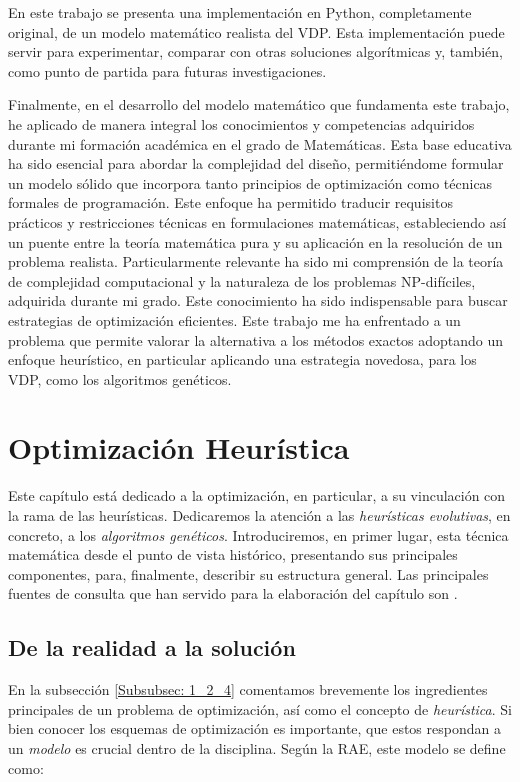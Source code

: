 \documentclass[12pt,a4paper]{book}
\begin{document}
En este trabajo se presenta una implementación en Python, completamente original, de un modelo matemático realista del VDP. Esta implementación puede servir para experimentar, comparar con otras soluciones algorítmicas y, también, como punto de partida para futuras investigaciones. 

Finalmente, en el desarrollo del modelo matemático que fundamenta este trabajo, he aplicado de manera integral los conocimientos y competencias adquiridos durante mi formación académica en el grado de Matemáticas. Esta base educativa ha sido esencial para abordar la complejidad del diseño, permitiéndome formular un modelo sólido que incorpora tanto principios de optimización como técnicas formales de programación.  Este enfoque ha permitido traducir requisitos prácticos y restricciones técnicas en formulaciones matemáticas, estableciendo así un puente entre la teoría matemática pura y su aplicación en la resolución de un problema realista. Particularmente relevante ha sido mi comprensión de la teoría de complejidad computacional y la naturaleza de los problemas NP-difíciles, adquirida durante mi grado. Este conocimiento ha sido indispensable para buscar estrategias de optimización eficientes. Este trabajo me ha enfrentado a un problema que permite valorar la alternativa a los métodos exactos adoptando un enfoque heurístico, en particular aplicando una estrategia novedosa, para los VDP, como los algoritmos genéticos. 

\chapter{Optimización Heurística} \label{Capitulo_2}
Este capítulo está dedicado a la optimización, en particular, a su vinculación con la rama de las heurísticas. Dedicaremos la atención a las \textsl{heurísticas evolutivas}, en concreto, a los \textsl{algoritmos genéticos}. Introduciremos, en primer lugar, esta técnica matemática desde el punto de vista histórico, presentando sus principales componentes, para, finalmente, describir su estructura general. Las principales fuentes de consulta que han servido para la elaboración del capítulo son \cite{cuevas_matlab_2021, e_besada_optimizacion_nodate, hooker_testing_1995, gparedes_hernandez_fundamentos_2021, linares_modelos_2001, silver_overview_2004}. 

\section{De la realidad a la solución} \label{Subsec: 3_1}
En la subsección \ref{Subsubsec: 1_2_4} comentamos brevemente los ingredientes principales de un problema de optimización, así como el concepto de \textsl{heurística}. Si bien conocer los esquemas de optimización es importante, que estos respondan a un \textsl{modelo} es crucial dentro de la disciplina. Según la RAE, este modelo se define como: 
\end{document}
